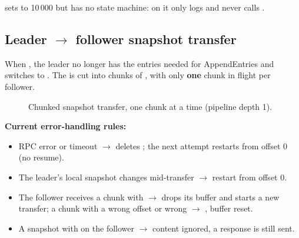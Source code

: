  sets  to 10\,000 but has no state machine: on
 it only logs and never calls .

\subsection{Leader $\rightarrow$ follower snapshot transfer}

When , the leader no longer has the entries needed for
AppendEntries and switches to . The  is cut into chunks of
, with only \textbf{one} chunk in flight per follower.

\begin{figure}[H]
\centering
{}
\caption{Chunked snapshot transfer, one chunk at a time (pipeline depth 1).}
\end{figure}

\textbf{Current error-handling rules:}
\begin{itemize}[nosep]
  \item RPC error or timeout $\rightarrow$  deletes ; the next attempt restarts from offset 0 (no resume).
  \item The leader's local snapshot changes mid-transfer $\rightarrow$ restart from offset 0.
  \item The follower receives a chunk with  $\rightarrow$ drops its buffer and starts a new transfer; a chunk with a wrong offset or wrong  $\rightarrow$ , buffer reset.
  \item A snapshot with  on the follower $\rightarrow$ content ignored, a response is still sent.
\end{itemize}

